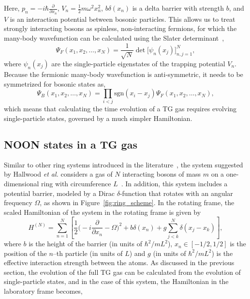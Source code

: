\noindent Here, $p_n = -i\hbar\frac{\partial}{\partial x_n}$, $V_n = \frac{1}{2}m\omega^2x_n^2$, $b\delta(x_n)$ is a delta barrier with strength $b$, and $V$ is an interaction potential between bosonic particles.
This allows us to treat strongly interacting bosons as spinless, non-interacting fermions, for which the many-body wavefunction can be calculated using the Slater determinant~\cite{slater1929},
\begin{equation}
\Psi_F (x_1, x_2, \ldots, x_N) = \frac{1}{\sqrt{N}} \det\Big[\psi_n(x_j)\Big]_{n,j=1}^N,
\end{equation}
\noindent where $\psi_n(x_j)$ are the single-particle eigenstates of the trapping potential $V_n$.
Because the fermionic many-body wavefunction is anti-symmetric, it needs to be symmetrized for bosonic states as, 
\begin{equation}
\Psi_B(x_1, x_2, \ldots, x_N) =
\prod_{i < j}
\mathrm{sgn}(x_i - x_j)\Psi_F(x_1, x_2, \ldots, x_N),
\end{equation}
\noindent which means that calculating the time evolution of a TG gas requires evolving single-particle states, governed by a much simpler Hamiltonian.

\subsection{NOON states in a TG gas}
\label{sec:controltro}

Similar to other ring systems introduced in the literature~\cite{das2002,girardeau2009}, the system suggested by Hallwood \textit{et al.} considers a gas of $N$ interacting bosons of mass $m$ on a one-dimensional ring with circumference $L$~\cite{hallwood2010}.
In addition, this system includes a potential barrier, modeled by a Dirac $\delta$-function that rotates with an angular frequency $\Omega$, as shown in Figure~\ref{fig:ring_scheme}.
In the rotating frame, the scaled Hamiltonian of the system in the rotating frame is given by \cite{hallwood2010}
\begin{equation}H^{(N)} = \sum_{n=1} ^{N} \left[{\frac{1}{2}\bigg(-i\frac{\partial}{\partial x_n}-\Omega}\bigg)^2 + b\delta(x_n) +g \sum_{j<k} ^{N} \delta (x_j - x_k )\right],
\end{equation}
\noindent where $b$ is the height of the barrier (in units of $\hbar^2/mL^2$), $x_n \in \left[-1/2,1/2\right]$ is the position of the $n$--th particle (in units of $L$) and $g$ (in units of $\hbar^2/mL^2$) is the effective interaction strength between the atoms.
As discussed in the previous section, the evolution of the full TG gas can be calculated from the evolution of single-particle states, and in the case of this system, the Hamiltonian in the laboratory frame becomes,

